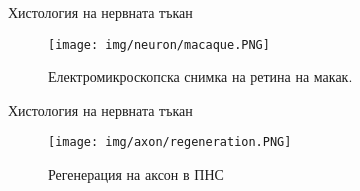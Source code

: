 \begin{frame}[t]{Хистология на нервната тъкан}
    \begin{figure}[htbp!]
      \centering
      \texttt{[image: img/neuron/macaque.PNG]}
      \caption{Електромикроскопска снимка на ретина на макак. \cite[Фиг 1.3]{Neuron}}
    \end{figure}
\end{frame}


\begin{frame}[t]{Хистология на нервната тъкан}
    \begin{figure}[htbp!]
      \centering
      \texttt{[image: img/axon/regeneration.PNG]}
      \caption{Регенерация на аксон в ПНС \cite[Фиг 25.5]{Neuroscience}}
    \end{figure}
\end{frame}

